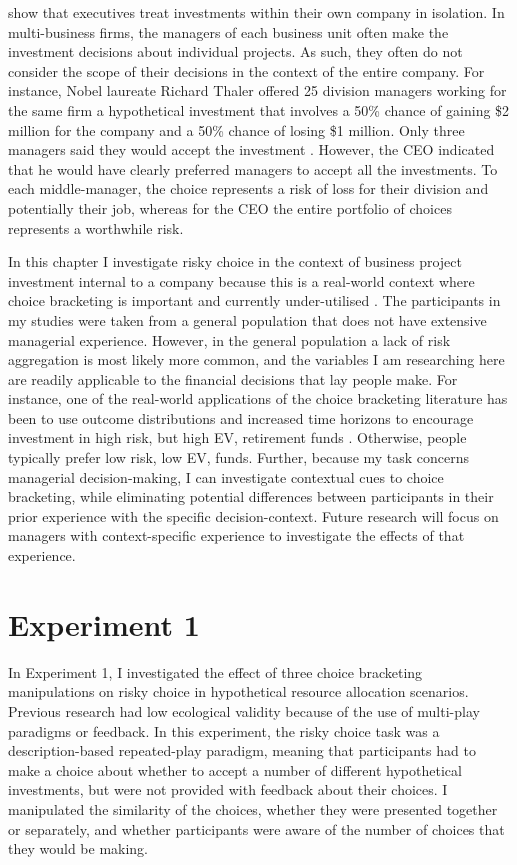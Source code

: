 \documentclass[a4paper, nobind, dvipsnames]{templates/ociamthesis}
\theoremstyle{definition}
\theoremstyle{definition}
\theoremstyle{definition}
\theoremstyle{definition}
\theoremstyle{remark}
\begin{document}
\textcite{lovallo2020} show that executives treat investments within their own company in
isolation. In multi-business firms, the managers of each business unit often
make the investment decisions about individual projects. As such, they often do
not consider the scope of their decisions in the context of the entire company.
For instance, Nobel laureate Richard Thaler offered 25 division managers working
for the same firm a hypothetical investment that involves a 50\% chance of
gaining \$2 million for the company and a 50\% chance of losing \$1 million. Only
three managers said they would accept the investment \autocite{thaler1999}. However, the
CEO indicated that he would have clearly preferred managers to accept all the
investments. To each middle-manager, the choice represents a risk of loss for
their division and potentially their job, whereas for the CEO the entire
portfolio of choices represents a worthwhile risk.

In this chapter I investigate risky choice in the context of business project
investment internal to a company because this is a real-world context where
choice bracketing is important and currently under-utilised \autocite{lovallo2020}. The
participants in my studies were taken from a general population that does not
have extensive managerial experience. However, in the general population a lack
of risk aggregation is most likely more common, and the variables I am
researching here are readily applicable to the financial decisions that lay
people make. For instance, one of the real-world applications of the choice
bracketing literature has been to use outcome distributions and increased time
horizons to encourage investment in high risk, but high EV, retirement funds
\autocite[e.g.,][]{benartzi1999}. Otherwise, people typically prefer low risk, low EV,
funds. Further, because my task concerns managerial decision-making, I can
investigate contextual cues to choice bracketing, while eliminating potential
differences between participants in their prior experience with the specific
decision-context. Future research will focus on managers with
context-specific experience to investigate the effects of that experience.

\section{Experiment 1}

In Experiment 1, I investigated the effect of three choice bracketing
manipulations on risky choice in hypothetical resource allocation scenarios.
Previous research had low ecological validity because of the use of multi-play
paradigms or feedback. In this experiment, the risky choice task was a
description-based repeated-play paradigm, meaning that participants had to make
a choice about whether to accept a number of different hypothetical investments,
but were not provided with feedback about their choices. I manipulated the
similarity of the choices, whether they were presented together or separately,
and whether participants were aware of the number of choices that they would be
making.
\end{document}
